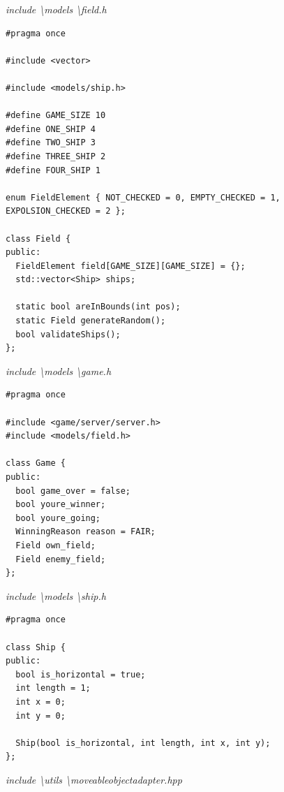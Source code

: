 \documentclass[a4paper,14pt]{extarticle}
\begin{document}
\textit{include \textbackslash models \textbackslash field.h}
\begin{verbatim}
#pragma once

#include <vector>

#include <models/ship.h>

#define GAME_SIZE 10
#define ONE_SHIP 4
#define TWO_SHIP 3
#define THREE_SHIP 2
#define FOUR_SHIP 1

enum FieldElement { NOT_CHECKED = 0, EMPTY_CHECKED = 1, EXPOLSION_CHECKED = 2 };

class Field {
public:
  FieldElement field[GAME_SIZE][GAME_SIZE] = {};
  std::vector<Ship> ships;

  static bool areInBounds(int pos);
  static Field generateRandom();
  bool validateShips();
};

\end{verbatim}
\textit{include \textbackslash models \textbackslash game.h}
\begin{verbatim}
#pragma once

#include <game/server/server.h>
#include <models/field.h>

class Game {
public:
  bool game_over = false;
  bool youre_winner;
  bool youre_going;
  WinningReason reason = FAIR;
  Field own_field;
  Field enemy_field;
};

\end{verbatim}
\textit{include \textbackslash models \textbackslash ship.h}
\begin{verbatim}
#pragma once

class Ship {
public:
  bool is_horizontal = true;
  int length = 1;
  int x = 0;
  int y = 0;

  Ship(bool is_horizontal, int length, int x, int y);
};

\end{verbatim}
\textit{include \textbackslash utils \textbackslash moveableobjectadapter.hpp}
\end{document}
